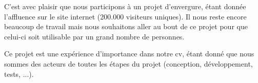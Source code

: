 C'est avec plaisir que nous participons à un projet d'envergure, étant donnée l'affluence sur le site internet (200.000 visiteurs uniques). Il nous reste encore beaucoup de travail mais nous souhaitons aller au bout de ce projet pour que celui-ci soit utilisable par un grand nombre de personnes.

Ce projet est une expérience d'importance dans notre cv, étant donné que nous sommes des acteurs de toutes les étapes du projet (conception, développement, tests, ...).
